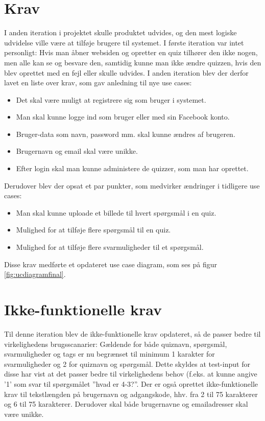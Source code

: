 \section{Krav}
I anden iteration i projektet skulle produktet udvides, og den mest logiske udvidelse ville være at tilføje brugere til systemet. I første iteration var intet personligt: Hvis man åbner websiden og opretter en quiz tilhører den ikke nogen, men alle kan se og besvare den, samtidig kunne man ikke ændre quizzen, hvis den blev oprettet med en fejl eller skulle udvides.
I anden iteration blev der derfor lavet en liste over krav, som gav anledning til nye use cases:
\begin{itemize}
\item Det skal være muligt at registrere sig som bruger i systemet.
\item Man skal kunne logge ind som bruger eller med sin Facebook konto.
\item Bruger-data som navn, password mm. skal kunne ændres af brugeren.
\item Brugernavn og email skal være unikke.
\item Efter login skal man kunne administere de quizzer, som man har oprettet.
\end{itemize}

Derudover blev der opsat et par punkter, som medvirker ændringer i tidligere use cases:
\begin{itemize}
\item Man skal kunne uploade et billede til hvert spørgsmål i en quiz.
\item Mulighed for at tilføje flere spørgsmål til en quiz.
\item Mulighed for at tilføje flere svarmuligheder til et spørgsmål.
\end{itemize}

Disse krav medførte et opdateret use case diagram, som ses på figur \ref{fig:ucdiagramfinal}.


\section{Ikke-funktionelle krav}
Til denne iteration blev de ikke-funktionelle krav opdateret, så de passer bedre til virkelighedens brugsscanarier:
Gældende for både quiznavn, spørgsmål, svarmuligheder og tags er nu begrænset til minimum 1 karakter for svarmuligheder og 2 for quiznavn og spørgsmål. Dette skyldes at test-input for disse har vist at det passer bedre til virkelighedens behov (f.eks. at kunne angive '1' som svar til spørgsmålet ''hvad er 4-3?''.
Der er også oprettet ikke-funktionelle krav til tekstlængden på brugernavn og adgangskode, hhv. fra 2 til 75 karakterer og 6 til 75 karakterer. 
Derudover skal både brugernavne og emailadresser skal være unikke.
